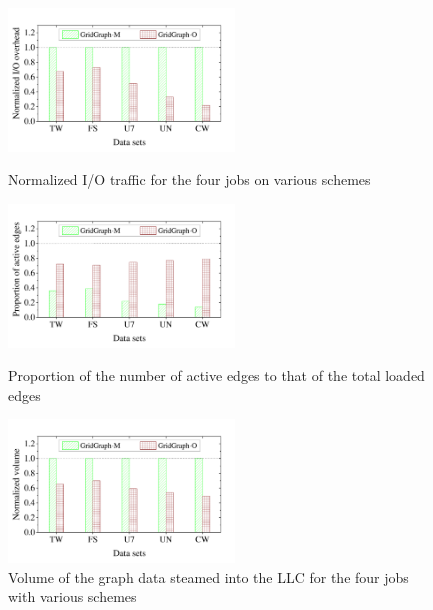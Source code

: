 \documentclass[10pt,journal,compsoc]{IEEEtran}
\begin{document}
\begin{figure}[t]
	\begin{minipage}[t]{0.31\textwidth}
		\centering
		\includegraphics[width=6cm]{IO.pdf}
		\vspace{-0.98cm}
		\caption{Normalized I/O traffic for the four jobs on various schemes}
		\label{IO}
	\end{minipage}
	\hfill
	\begin{minipage}[t]{0.31\textwidth}
		\centering
		\includegraphics[width=6cm]{ratio_active.pdf}
		\vspace{-0.98cm}
		\caption{Proportion of the number of active edges to that of the total loaded edges}
		\label{ratio_active}
	\end{minipage}
	\hfill
	\begin{minipage}[t]{0.32\textwidth}
		\centering
		\includegraphics[width=6cm]{cache_swap.pdf}
		\vspace{-0.98cm}
		\caption{Volume of the graph data steamed into the LLC for the four jobs with various schemes}
		\label{cache_swap}
	\end{minipage}
	\vspace{-0.77cm}
\end{figure}

\vspace{-8pt}
\end{document}
